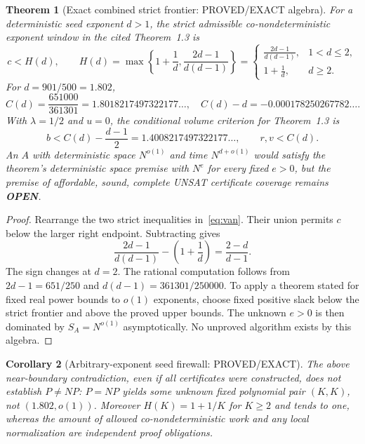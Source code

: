 \documentclass[11pt]{article}
\newtheorem{theorem}{Theorem}
\newtheorem{corollary}[theorem]{Corollary}
\newcommand{\openstatus}{\textbf{OPEN}}
\begin{document}
\begin{theorem}[Exact combined strict frontier: PROVED/EXACT algebra]
For a deterministic seed exponent $d>1$, the strict admissible
co-nondeterministic exponent window in the cited Theorem~1.3 is
\[
 c<H(d),\qquad
 H(d)=\max\!\left\{1+\frac1d,\frac{2d-1}{d(d-1)}\right\}
 =\begin{cases}
 \frac{2d-1}{d(d-1)},&1<d\le2,\\
 1+\frac1d,&d\ge2.
 \end{cases}
\]
For $d=901/500=1.802$,
\[
 C(d)=\frac{651000}{361301}=1.8018217497322177\ldots,
 \quad C(d)-d=-0.000178250267782\ldots.
\]
With $\lambda=1/2$ and $u=0$, the \emph{conditional}
volume criterion for Theorem~1.3 is
\[
 b<C(d)-\frac{d-1}{2}
 =1.4008217497322177\ldots,
 \qquad r,v<C(d).
\]
An $A$ with deterministic space $N^{o(1)}$ and time
$N^{d+o(1)}$ would satisfy the theorem's deterministic space premise
with $N^e$ for every fixed $e>0$, but the premise of \emph{affordable,
sound, complete UNSAT certificate coverage} remains \openstatus.
\end{theorem}
\begin{proof}
Rearrange the two strict inequalities in~\eqref{eq:van}. Their union
permits $c$ below the larger right endpoint. Subtracting gives
\[
 \frac{2d-1}{d(d-1)}-\left(1+\frac1d\right)
 =\frac{2-d}{d-1}.
\]
The sign changes at $d=2$. The rational computation follows from
$2d-1=651/250$ and $d(d-1)=361301/250000$.
To apply a theorem stated for fixed real power bounds to $o(1)$
exponents, choose fixed positive slack below the strict frontier
and above the proved upper bounds. The unknown $e>0$ is then dominated
by $S_A=N^{o(1)}$ asymptotically. No unproved algorithm exists by this algebra.
\end{proof}

\begin{corollary}[Arbitrary-exponent seed firewall: PROVED/EXACT]
The above near-boundary contradiction, even if all certificates were
constructed, does \emph{not} establish $P\ne NP$: $P=NP$ yields some
unknown fixed polynomial pair $(K,K)$, not
$(1.802,o(1))$. Moreover $H(K)=1+1/K$ for $K\ge2$ and tends to one,
whereas the amount of allowed co-nondeterministic work and any local
normalization are independent proof obligations.
\end{corollary}
\end{document}
